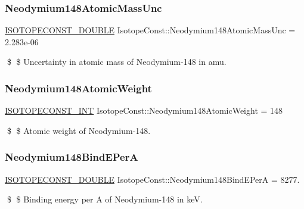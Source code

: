 \subsubsection{\texorpdfstring{Neodymium148\+Atomic\+Mass\+Unc}{Neodymium148AtomicMassUnc}}
{\footnotesize\ttfamily \mbox{\hyperlink{group___isotope_const-_macros_ga8f45a7272ce02c0b4c65c44636ed719a}{I\+S\+O\+T\+O\+P\+E\+C\+O\+N\+S\+T\+\_\+\+D\+O\+U\+B\+LE}} Isotope\+Const\+::\+Neodymium148\+Atomic\+Mass\+Unc = 2.\+283e-\/06}

\$ \$ Uncertainty in atomic mass of Neodymium-\/148 in amu. \mbox{\label{group___isotope_const-_neodymium-_nd148_ga601d4cd9de858d2dbca06efaef4483a8}} 
\subsubsection{\texorpdfstring{Neodymium148\+Atomic\+Weight}{Neodymium148AtomicWeight}}
{\footnotesize\ttfamily \mbox{\hyperlink{group___isotope_const-_macros_ga5f18360b3e99483a35c32d789e62621c}{I\+S\+O\+T\+O\+P\+E\+C\+O\+N\+S\+T\+\_\+\+I\+NT}} Isotope\+Const\+::\+Neodymium148\+Atomic\+Weight = 148}

\$ \$ Atomic weight of Neodymium-\/148. \mbox{\label{group___isotope_const-_neodymium-_nd148_ga423b44a614b7a32c6ab25117c6dd50a7}} 
\subsubsection{\texorpdfstring{Neodymium148\+Bind\+E\+PerA}{Neodymium148BindEPerA}}
{\footnotesize\ttfamily \mbox{\hyperlink{group___isotope_const-_macros_ga8f45a7272ce02c0b4c65c44636ed719a}{I\+S\+O\+T\+O\+P\+E\+C\+O\+N\+S\+T\+\_\+\+D\+O\+U\+B\+LE}} Isotope\+Const\+::\+Neodymium148\+Bind\+E\+PerA = 8277.}

\$ \$ Binding energy per A of Neodymium-\/148 in keV. \mbox{\label{group___isotope_const-_neodymium-_nd148_ga941077ab26edd8ef8f45f044637dcfcc}} 
